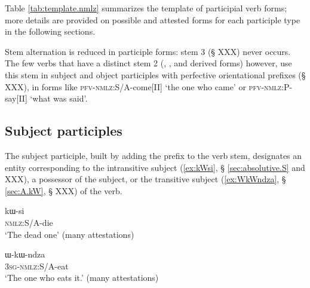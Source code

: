 Table \ref{tab:template.nmlz} summarizes the template of participial verb forms; more details are provided on possible and attested forms for each participle type in the following sections.

\begin{table}[h]
\caption{The template of participial verb forms in Japhug} \centering \label{tab:template.nmlz}
\end{table}

Stem alternation is reduced in participle forms: stem 3 (§ XXX) never occurs. The few verbs that have a distinct stem 2 (, ,  and derived forms) however, use this stem in subject and object participles with perfective orientational prefixes (§ XXX), in forms like  \textsc{pfv}-\textsc{nmlz}:S/A-come[II] `the one who came'
or  \textsc{pfv}-\textsc{nmlz}:P-say[II] `what was said'.
 

\subsection{Subject participles} \label{sec:subject.participles}
The subject participle, built by adding the prefix  to the verb stem, designates an entity corresponding to the intransitive subject (\ref{ex:kWsi}, § \ref{sec:absolutive.S} and XXX), a possessor of the subject, or the transitive subject (\ref{ex:WkWndza}, § \ref{sec:A.kW}, § XXX) of the verb. 

 \begin{exe}
\ex \label{ex:kWsi}
\gll kɯ-si  \\
  \textsc{nmlz}:S/A-die \\
 \glt  `The dead one' (many attestations)
\end{exe}

 \begin{exe} 
\ex \label{ex:WkWndza}
\gll ɯ-kɯ-ndza \\
  \textsc{3sg}-\textsc{nmlz}:S/A-eat \\
 \glt  `The one who eats it.' (many attestations)
\end{exe}

